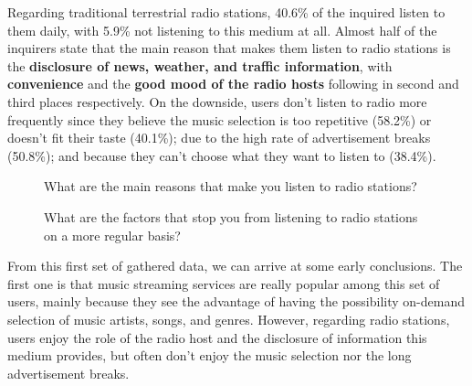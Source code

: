 Regarding traditional terrestrial radio stations, 40.6\% of the inquired listen to them daily, with 5.9\% not listening to this medium at all. Almost half of the inquirers state that the main reason that makes them listen to radio stations is the \textbf{disclosure of news, weather, and traffic information}, with \textbf{convenience} and the \textbf{good mood of the radio hosts} following in second and third places respectively. On the downside, users don't listen to radio more frequently since they believe the music selection is too repetitive (58.2\%) or doesn't fit their taste (40.1\%); due to the high rate of advertisement breaks (50.8\%); and because they can't choose what they want to listen to (38.4\%).

\begin{figure}
	\centering
	\caption{What are the main reasons that make you listen to radio stations?}
	\begin{bchart}[step=10,max=45,unit=\%,width=0.8\textwidth]
            \smallskip
            \smallskip
            \smallskip
            \smallskip
    \end{bchart}
\end{figure}



\begin{figure}
	\centering
	\caption{What are the factors that stop you from listening to radio stations on a more regular basis?}
	\begin{bchart}[step=10,max=70,unit=\%, width=0.8\textwidth]
            \smallskip
            \smallskip
            \smallskip
            \smallskip
    \end{bchart}
\end{figure}


From this first set of gathered data, we can arrive at some early conclusions. The first one is that music streaming services are really popular among this set of users, mainly because they see the advantage of having the possibility on-demand selection of music artists, songs, and genres. However, regarding radio stations, users enjoy the role of the radio host and the disclosure of information this medium provides, but often don't enjoy the music selection nor the long advertisement breaks.

